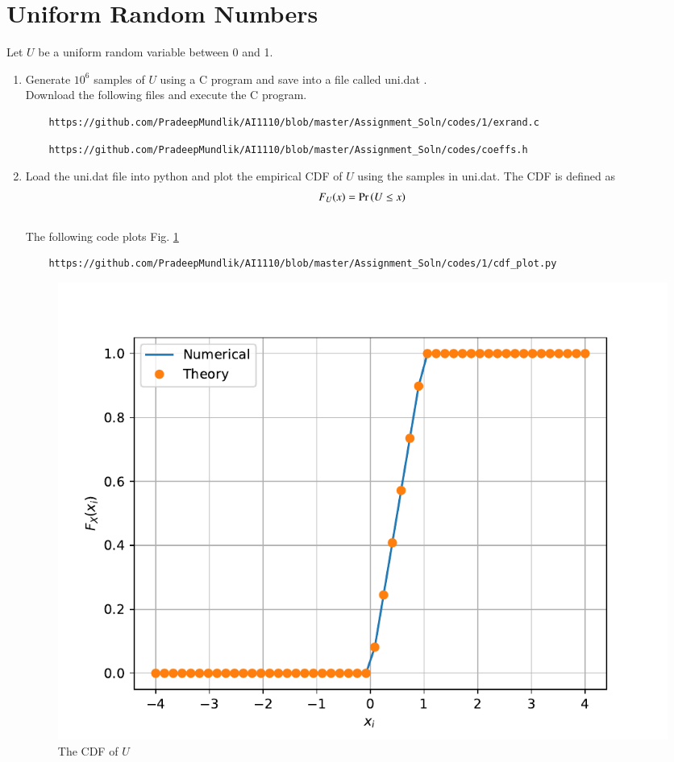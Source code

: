 \documentclass[journal,12pt,twocolumn]{IEEEtran}
\renewcommand\thesection{\arabic{section}}
\begin{document}
\section{Uniform Random Numbers}
Let $U$ be a uniform random variable between 0 and 1.
\begin{enumerate}[label=\thesection.\arabic*
,ref=\thesection.\theenumi]
\item Generate $10^6$ samples of $U$ using a C program and save into a file called uni.dat .
\\
\solution Download the following files and execute the  C program.
\begin{lstlisting}
	https://github.com/PradeepMundlik/AI1110/blob/master/Assignment_Soln/codes/1/exrand.c 
\end{lstlisting}
\begin{lstlisting}
	https://github.com/PradeepMundlik/AI1110/blob/master/Assignment_Soln/codes/coeffs.h
\end{lstlisting}

%
\item
Load the uni.dat file into python and plot the empirical CDF of $U$ using the samples in uni.dat. The CDF is defined as
\begin{align}
F_{U}(x) = \Pr\left(U \le x\right)
\end{align}
\\
\solution  The following code plots Fig. \ref{fig:uni_cdf}
\begin{lstlisting}
	https://github.com/PradeepMundlik/AI1110/blob/master/Assignment_Soln/codes/1/cdf_plot.py
\end{lstlisting}
\begin{figure}[h]
\centering
\includegraphics[width=\columnwidth]{figs/1/uni_cdf.pdf}
\caption{The CDF of $U$}
\label{fig:uni_cdf}
\end{figure}


\end{enumerate}
\end{document}
